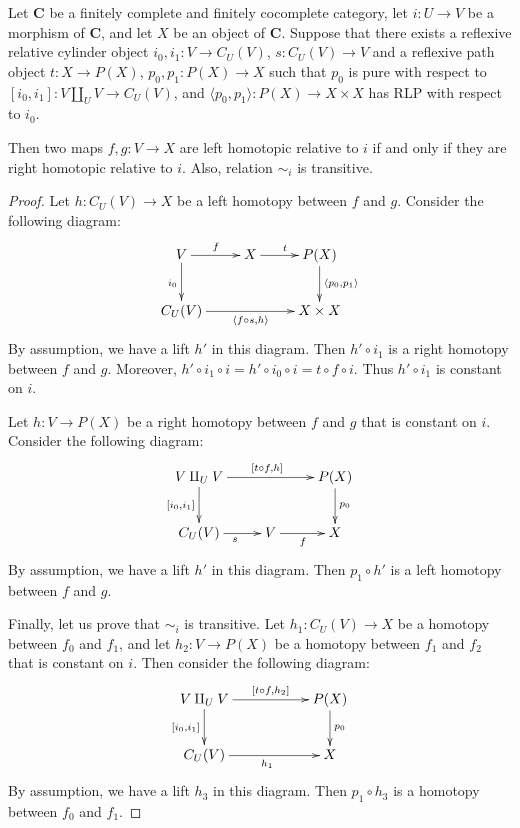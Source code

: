 \documentclass{amsart}
\theoremstyle{definition}
\newcommand{\cat}[1]{\mathbf{#1}}
\newcommand{\C}{\cat{C}}
\newcommand{\cyli}{i}
\begin{document}
\begin{lem}
Let $\C$ be a finitely complete and finitely cocomplete category, let $i : U \to V$ be a morphism of $\C$, and let $X$ be an object of $\C$.
Suppose that there exists a reflexive relative cylinder object $\cyli_0,\cyli_1 : V \to C_U(V)$, $s : C_U(V) \to V$
and a reflexive path object $t : X \to P(X)$, $p_0,p_1 : P(X) \to X$ such that $p_0$ is pure with respect to $[\cyli_0,\cyli_1] : V \amalg_U V \to C_U(V)$,
and $\langle p_0, p_1 \rangle : P(X) \to X \times X$ has RLP with respect to $\cyli_0$.

Then two maps $f,g : V \to X$ are left homotopic relative to $i$ if and only if they are right homotopic relative to $i$.
Also, relation $\sim_i$ is transitive.
\end{lem}
\begin{proof}
Let $h : C_U(V) \to X$ be a left homotopy between $f$ and $g$.
Consider the following diagram:
\[ \xymatrix{ V \ar[r]^f \ar[d]_{\cyli_0} & X \ar[r]^t & P(X) \ar[d]^{\langle p_0, p_1 \rangle} \\
              C_U(V) \ar[rr]_{\langle f \circ s, h \rangle} & & X \times X
            } \]
By assumption, we have a lift $h'$ in this diagram.
Then $h' \circ \cyli_1$ is a right homotopy between $f$ and $g$.
Moreover, $h' \circ \cyli_1 \circ i = h' \circ \cyli_0 \circ i = t \circ f \circ i$.
Thus $h' \circ \cyli_1$ is constant on $i$.

Let $h : V \to P(X)$ be a right homotopy between $f$ and $g$ that is constant on $i$.
Consider the following diagram:
\[ \xymatrix{ V \amalg_U V \ar[rr]^{[t \circ f, h]} \ar[d]_{[\cyli_0,\cyli_1]} & & P(X) \ar[d]^{p_0} \\
              C_U(V) \ar[r]_s & V \ar[r]_f & X
            } \]
By assumption, we have a lift $h'$ in this diagram.
Then $p_1 \circ h'$ is a left homotopy between $f$ and $g$.

Finally, let us prove that $\sim_i$ is transitive.
Let $h_1 : C_U(V) \to X$ be a homotopy between $f_0$ and $f_1$, and let $h_2 : V \to P(X)$ be a homotopy between $f_1$ and $f_2$ that is constant on $i$.
Then consider the following diagram:
\[ \xymatrix{ V \amalg_U V \ar[rr]^-{[t \circ f, h_2]} \ar[d]_{[\cyli_0,\cyli_1]} & & P(X) \ar[d]^{p_0} \\
              C_U(V) \ar[rr]_{h_1} & & X
            } \]
By assumption, we have a lift $h_3$ in this diagram.
Then $p_1 \circ h_3$ is a homotopy between $f_0$ and $f_1$.
\end{proof}
\end{document}
